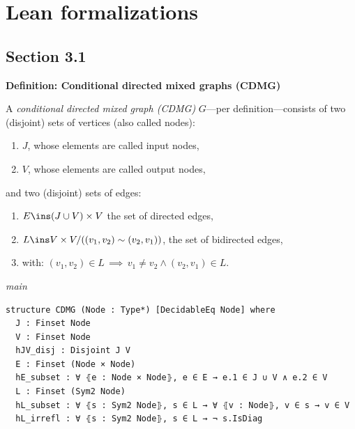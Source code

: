 %

\providecommand{\appendixTexSize}{\footnotesize}
\providecommand{\appendixLeanSize}{\footnotesize}
\providecommand{\appendixNotesGap}{1em}

\chapter{Lean formalizations}\label{chap:appendix_a}

\section*{Section 3.1}

\noindent\textbf{Definition: Conditional directed mixed graphs (CDMG)}\par\smallskip
{\appendixTexSize
    \label{def-cdmg}
    A \emph{conditional directed mixed graph (CDMG)} $G$---per definition---consists of two (disjoint) sets of
    vertices (also called nodes):
    \begin{enumerate}[label=\roman*.)]
        \item $J$, whose elements are called input nodes,
        \item $V$, whose elements are called output nodes,
    \end{enumerate}
    and two (disjoint) sets of edges:
    \begin{enumerate}[resume,label=\roman*.)]
        \item $E \ins (J \cup V) \times V$ the set of directed edges,
        \item $L \ins V \times V/((v_1,v_2) \sim (v_2,v_1)) $, the set of bidirected edges, 
        \item[]    with: $(v_1,v_2) \in L \, \implies\, v_1\neq v_2 \land (v_2,v_1) \in L$.
    \end{enumerate}
\par}
\smallskip
{\small\textit{main}}
\begin{verbatim}
structure CDMG (Node : Type*) [DecidableEq Node] where
  J : Finset Node
  V : Finset Node
  hJV_disj : Disjoint J V
  E : Finset (Node × Node)
  hE_subset : ∀ ⦃e : Node × Node⦄, e ∈ E → e.1 ∈ J ∪ V ∧ e.2 ∈ V
  L : Finset (Sym2 Node)
  hL_subset : ∀ ⦃s : Sym2 Node⦄, s ∈ L → ∀ ⦃v : Node⦄, v ∈ s → v ∈ V
  hL_irrefl : ∀ ⦃s : Sym2 Node⦄, s ∈ L → ¬ s.IsDiag
\end{verbatim}
~%

